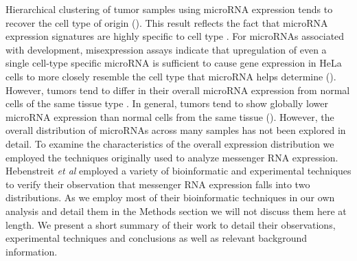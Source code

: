 \documentclass[12pt]{report}
\begin{document}
Hierarchical clustering of tumor samples using microRNA expression tends to recover the cell type of origin (). This 
result reflects the fact that microRNA expression signatures are highly specific 
to cell type \cite{Gaur2007}. For microRNAs associated with development,
misexpression assays indicate that upregulation of even a 
single cell-type specific microRNA is sufficient to cause gene expression in HeLa cells to 
more closely resemble the cell type that microRNA helps determine (). However, 
tumors tend to differ in their overall microRNA expression from normal cells of the same tissue 
type \cite{Gaur2007}. In general, tumors tend to show globally lower microRNA expression than 
normal cells from the same tissue (). However, the overall distribution of 
microRNAs across many samples has not been explored in detail. To examine the 
characteristics of the overall expression distribution we employed the 
techniques originally used to analyze messenger RNA expression.
Hebenstreit \emph{et al} employed a variety of bioinformatic and experimental 
techniques to verify their observation that messenger RNA expression falls into 
two distributions. As we employ most of their bioinformatic techniques in our 
own analysis and detail them in the Methods section we will not discuss them here at length.
We present a short summary of their work to detail their observations, experimental techniques 
and conclusions as well as relevant background information.
 
\end{document}
